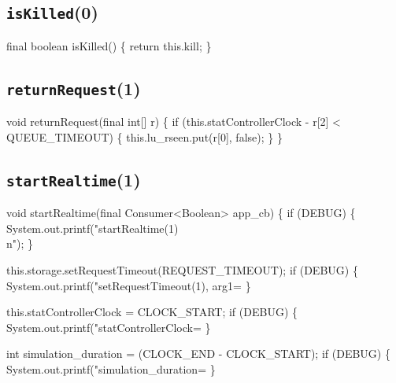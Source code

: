 \subsection{\texttt{isKilled}(0)}
\nwenddocs{}\endmoddef{}
final boolean isKilled() \{
  return this.kill;
\}
\eatline
{}\nwendcode{}\nwdocspar
\subsection{\texttt{returnRequest}(1)}
\nwenddocs{}\endmoddef{}
void returnRequest(final int[] r) \{
  if (this.statControllerClock - r[2] < QUEUE_TIMEOUT) \{
    this.lu_rseen.put(r[0], false);
  \}
\}
\eatline
{}\nwendcode{}\nwdocspar
\subsection{\texttt{startRealtime}(1)}
\nwenddocs{}\endmoddef{}
void startRealtime(final Consumer<Boolean> app_cb) \{
  if (DEBUG) \{
    System.out.printf("startRealtime(1)\\n");
  \}

  this.storage.setRequestTimeout(REQUEST_TIMEOUT);
  if (DEBUG) \{
    System.out.printf("setRequestTimeout(1), arg1=%
  \}

  this.statControllerClock = CLOCK_START;
  if (DEBUG) \{
    System.out.printf("statControllerClock=%
  \}

  int simulation_duration = (CLOCK_END - CLOCK_START);
  if (DEBUG) \{
    System.out.printf("simulation_duration=%
  \}

